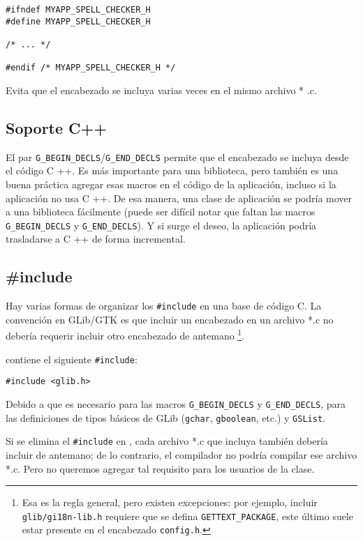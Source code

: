 \begin{lstlisting}
#ifndef MYAPP_SPELL_CHECKER_H
#define MYAPP_SPELL_CHECKER_H

/* ... */

#endif /* MYAPP_SPELL_CHECKER_H */
\end{lstlisting}

Evita que el encabezado se incluya varias veces en el mismo archivo * .c.

\subsection{Soporte C++}
El par \lstinline{G_BEGIN_DECLS}/\lstinline{G_END_DECLS} permite que el encabezado se incluya desde el código C ++. Es más importante para una biblioteca, pero también es una buena práctica agregar esas macros en el código de la aplicación, incluso si la aplicación no usa C ++. De esa manera, una clase de aplicación se podría mover a una biblioteca fácilmente (puede ser difícil notar que faltan las macros \lstinline{G_BEGIN_DECLS} y \lstinline{G_END_DECLS}). Y si surge el deseo, la aplicación podría trasladarse a C ++ de forma incremental.

\subsection{\#include}
\label{oop-semi-include-in-header}
Hay varias formas de organizar los \lstinline{#include} en una base de código C. La convención en GLib/GTK es que incluir un encabezado en un archivo *.c no debería requerir incluir otro encabezado de antemano \footnote{Esa es la regla general, pero existen excepciones: por ejemplo, incluir \lstinline {glib/gi18n-lib.h} requiere que se defina \lstinline{GETTEXT_PACKAGE}, este último suele estar presente en el encabezado \lstinline{config.h}.}.

 contiene el siguiente \lstinline{#include}:
\begin{lstlisting}
#include <glib.h>
\end{lstlisting}

Debido a que  es necesario para las macros \lstinline{G_BEGIN_DECLS} y \lstinline{G_END_DECLS}, para las definiciones de tipos básicos de GLib (\lstinline{gchar}, \lstinline{gboolean}, etc.) y \lstinline{GSList}.

Si se elimina el \lstinline{#include} en , cada archivo *.c que incluya  también debería incluir  de antemano; de lo contrario, el compilador no podría compilar ese archivo *.c. Pero no queremos agregar tal requisito para los usuarios de la clase.

